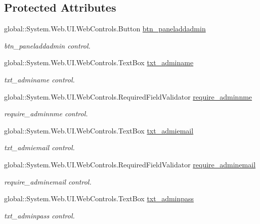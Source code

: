 \subsection*{Protected Attributes}
\begin{DoxyCompactItemize}
\item 
global\+::\+System.\+Web.\+U\+I.\+Web\+Controls.\+Button \mbox{\hyperlink{class_admin__add_admin_ac099ca5be16fa9184f3cd18fb9bba26f}{btn\+\_\+paneladdadmin}}
\begin{DoxyCompactList}\small\item\em btn\+\_\+paneladdadmin control. \end{DoxyCompactList}\item 
global\+::\+System.\+Web.\+U\+I.\+Web\+Controls.\+Text\+Box \mbox{\hyperlink{class_admin__add_admin_a989e7e48392b60b7d414188d08757ee4}{txt\+\_\+adminame}}
\begin{DoxyCompactList}\small\item\em txt\+\_\+adminame control. \end{DoxyCompactList}\item 
global\+::\+System.\+Web.\+U\+I.\+Web\+Controls.\+Required\+Field\+Validator \mbox{\hyperlink{class_admin__add_admin_a7616453cc8ae879ca0af5d8223900e3f}{require\+\_\+adminnme}}
\begin{DoxyCompactList}\small\item\em require\+\_\+adminnme control. \end{DoxyCompactList}\item 
global\+::\+System.\+Web.\+U\+I.\+Web\+Controls.\+Text\+Box \mbox{\hyperlink{class_admin__add_admin_ae757396c2c744a20a1b3b37794ca9d9b}{txt\+\_\+admiemail}}
\begin{DoxyCompactList}\small\item\em txt\+\_\+admiemail control. \end{DoxyCompactList}\item 
global\+::\+System.\+Web.\+U\+I.\+Web\+Controls.\+Required\+Field\+Validator \mbox{\hyperlink{class_admin__add_admin_abdba1d2252295175f77fffe9d85e36c7}{require\+\_\+adminemail}}
\begin{DoxyCompactList}\small\item\em require\+\_\+adminemail control. \end{DoxyCompactList}\item 
global\+::\+System.\+Web.\+U\+I.\+Web\+Controls.\+Text\+Box \mbox{\hyperlink{class_admin__add_admin_acdcfb7a0a9e36bc68036990de05a9cd8}{txt\+\_\+adminpass}}
\begin{DoxyCompactList}\small\item\em txt\+\_\+adminpass control. \end{DoxyCompactList}\item 

\end{DoxyCompactItemize}
